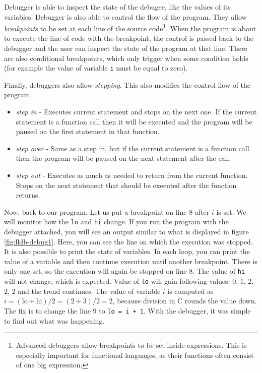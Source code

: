 Debugger is able to inspect the state of the debugee, like the values of its
variables. Debugger is also able to control the flow of the program. They allow
\textit{breakpoints} to be set at each line of the source
code\footnote{Advanced debuggers allow breakpoints to be set inside
expressions. This is especially important for functional languages, as their
functions often consist of one big expression.}. When the program is about to
execute the line of code with the breakpoint, the control is passed back to the
debugger and the user can inspect the state of the program at that line. There
are also conditional breakpoints, which only trigger when some condition holds
(for example the value of variable \texttt{i} must be equal to zero).

Finally, debuggers also allow \textit{stepping}. This also modifies the control
flow of the program.
\begin{itemize}
    \item \textit{step in} - Executes current statement and stops on the next
        one. If the current statement is a function call then it will be
        executed and the program will be paused on the first statement in that
        function.
    \item \textit{step over} - Same as a step in, but if the current statement
        is a function call then the program will be paused on the next
        statement after the call.
    \item \textit{step out} -  Executes as much as needed to return from the
        current function. Stops on the next statement that should be executed
        after the function returns.
\end{itemize}

Now, back to our program. Let us put a breakpoint on line $8$ after $i$ is set.
We will monitor how the \texttt{lo} and \texttt{hi} change. If you run the
program with the debugger attached, you will see an output similar to what is
displayed in figure \ref{fig:lldb-debug1}. Here, you can see the line on which
the execution was stopped. It is also possible to print the state of variables.
In each loop, you can print the value of a variable and then continue execution
until another breakpoint. There is only one set, so the execution will again be
stopped on line $8$. The value of \texttt{hi} will not change, which is
expected. Value of \texttt{lo} will gain following values: $0$, $1$, $2$, $2$,
$2$ and the trend continues. The value of variable $i$ is computed as $i =
(\text{lo} + \text{hi})/2 = (2 + 3)/2 = 2$, because division in C rounds the
value down. The fix is to change the line $9$ to \texttt{lo = i + 1}. With the
debugger, it was simple to find out what was happening.

